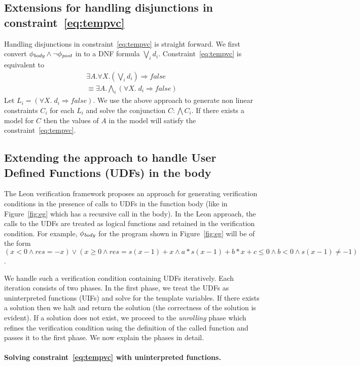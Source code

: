 \documentclass[a4paper,10pt]{article}
\begin{document}
\subsection{Extensions for handling disjunctions in constraint~\ref{eq:tempvc}}

Handling disjunctions in constraint~\ref{eq:tempvc} is straight forward. We first
convert $\mathit{\phi_{body}} \wedge \neg \mathit{\phi_{post}}$ in to a DNF formula $\bigvee_i d_i$.
Constraint~\ref{eq:tempvc} is equivalent to 
%
\begin{align}
\exists A. \forall X. (\bigvee_i d_i) \Rightarrow false \\
\equiv \exists A. \bigwedge_i (\forall X. \; d_i \Rightarrow false)
\end{align}
%
Let $L_i =  (\forall X. \; d_i \Rightarrow false)$. We use the above approach to generate non linear constraints $C_i$ for each $L_i$ and solve the conjunction $C: \bigwedge C_i$.
If there exists a model for $C$ then the values of $A$ in the model will satisfy the 
constraint~\ref{eq:tempvc}.

\subsection{Extending the approach to handle User Defined Functions (UDFs) in the body}

The Leon verification framework proposes an approach for generating verification conditions in the presence of calls to UDFs in the function body (like in Figure~\ref{fig:eg} which has a recursive call in the body). In the Leon approach, the calls to the UDFs are treated as logical functions and retained in the verification condition. For example, $\mathit{\phi_{body}}$ for the program shown in Figure~\ref{fig:eg} will  be of the form 
$(x < 0 \wedge res = -x) \vee (x \ge 0 \wedge res = s(x-1) + x \wedge a*s(x-1) + b*x + c \le 0 \wedge b < 0 \wedge s(x-1) \ne -1)$.

We handle such a verification condition containing UDFs iteratively. Each iteration consists of two phases. In the first phase, we treat the UDFs as uninterpreted functions (UIFs) and solve for the template variables.
If there exists a solution then we halt and return the solution (the correctness of the solution is evident).
If a solution does not exist, we proceed to the \emph{unrolling} phase which refines the verification condition using the definition of the called function and passes it to the 
first phase. We now explain the phases in detail.

\paragraph{Solving constraint~\ref{eq:tempvc} with uninterpreted functions.}
\end{document}
